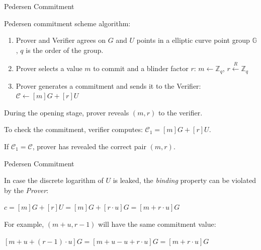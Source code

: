 \documentclass[xcolor={usenames,dvipsnames}]{beamer}
\begin{document}
    \begin{frame}{Pedersen Commitment}

        \begin{definition}
            Pedersen commitment scheme algorithm:
            \begin{enumerate}
                \item Prover and Verifier agrees on $G$ and $U$ points in a elliptic curve point group $\mathbb{G}$, $q$ is the order of the group.
                \item Prover selects a value $m$ to commit and a blinder factor $r$:
                        $m \leftarrow \mathbb{Z}_q$,
                        $r \xleftarrow{R} \mathbb{Z}_q$
                \item Prover generates a commitment and sends it to the Verifier:
                        $\mathcal{C} \gets [m]G + [r]U$
            \end{enumerate}
        \end{definition}

        During the opening stage, prover reveals $(m, r)$ to the verifier. 
        
        To check the commitment, verifier computes: $\mathcal{C}_1 = [m]G + [r]U$. 
        
        If $\mathcal{C}_1 = \mathcal{C}$, prover has revealed the correct pair $(m, r)$.

    \end{frame}

    \begin{frame}{Pedersen Commitment}

            In case the discrete logarithm of $U$ is leaked, the \textit{binding} property can be violated by the \textit{Prover}:
        
            \begin{center}
                $c = [m]G + [r]U = [m] G + [r \cdot u]G = [m + r \cdot u] G$
            \end{center}
        
            For example, $(m + u, r - 1)$ will have the same commitment value:
        
            \begin{center}
                $[m+u + (r-1) \cdot u] G = [m + u - u + r \cdot u] G = [m + r \cdot u] G$     
            \end{center}
            
    \end{frame}
\end{document}
